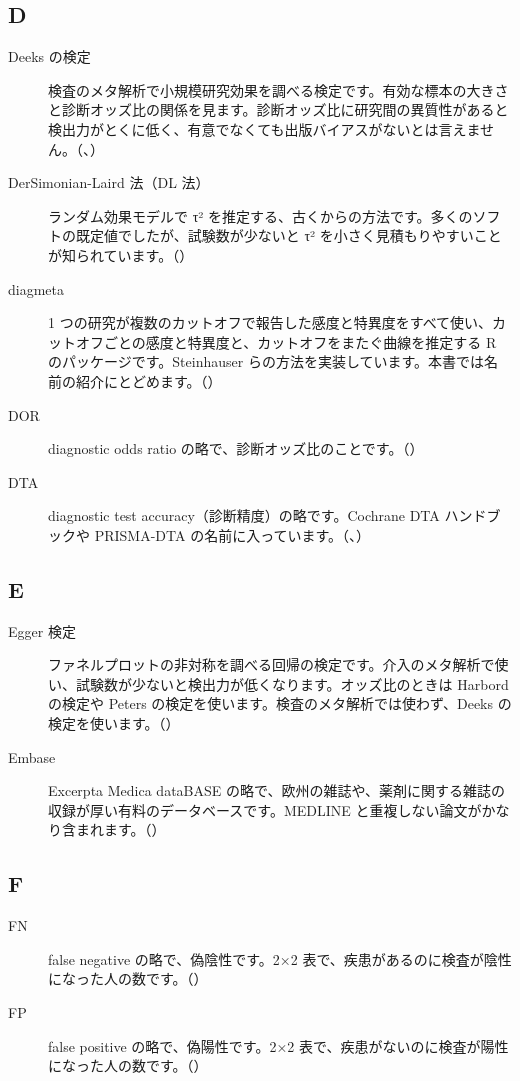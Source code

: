 \subsection*{D}
\begin{description}
\item[Deeks の検定] 検査のメタ解析で小規模研究効果を調べる検定です。有効な標本の大きさと診断オッズ比の関係を見ます。診断オッズ比に研究間の異質性があると検出力がとくに低く、有意でなくても出版バイアスがないとは言えません。（、）
\item[DerSimonian-Laird 法（DL 法）] ランダム効果モデルで τ² を推定する、古くからの方法です。多くのソフトの既定値でしたが、試験数が少ないと τ² を小さく見積もりやすいことが知られています。（）
\item[diagmeta] 1 つの研究が複数のカットオフで報告した感度と特異度をすべて使い、カットオフごとの感度と特異度と、カットオフをまたぐ曲線を推定する R のパッケージです。Steinhauser らの方法を実装しています。本書では名前の紹介にとどめます。（）
\item[DOR] diagnostic odds ratio の略で、診断オッズ比のことです。（）
\item[DTA] diagnostic test accuracy（診断精度）の略です。Cochrane DTA ハンドブックや PRISMA-DTA の名前に入っています。（、）
\end{description}

\subsection*{E}
\begin{description}
\item[Egger 検定] ファネルプロットの非対称を調べる回帰の検定です。介入のメタ解析で使い、試験数が少ないと検出力が低くなります。オッズ比のときは Harbord の検定や Peters の検定を使います。検査のメタ解析では使わず、Deeks の検定を使います。（）
\item[Embase] Excerpta Medica dataBASE の略で、欧州の雑誌や、薬剤に関する雑誌の収録が厚い有料のデータベースです。MEDLINE と重複しない論文がかなり含まれます。（）
\end{description}

\subsection*{F}
\begin{description}
\item[FN] false negative の略で、偽陰性です。2×2 表で、疾患があるのに検査が陰性になった人の数です。（）
\item[FP] false positive の略で、偽陽性です。2×2 表で、疾患がないのに検査が陽性になった人の数です。（）
\end{description}

